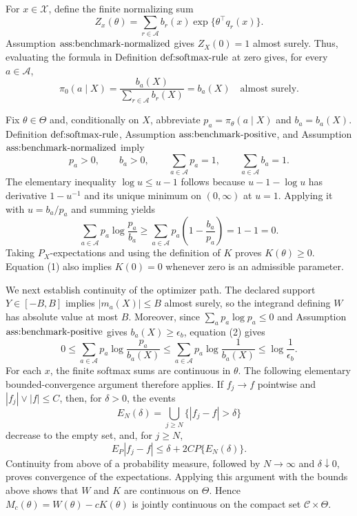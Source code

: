 For \(x\in\mathcal X\), define the finite normalizing sum
\[
 Z_x(\theta)=\sum_{r\in\mathcal A}b_r(x)
                 \exp\{\theta^\top q_r(x)\}.
\]
Assumption \(\textnormal{ass:benchmark-normalized}\) gives \(Z_X(0)=1\) almost surely.  Thus, evaluating the formula in Definition \(\textnormal{def:softmax-rule}\) at zero gives, for every \(a\in\mathcal A\),
\[
 \pi_0(a\mid X)
 =\frac{b_a(X)}{\sum_{r\in\mathcal A}b_r(X)}
 =b_a(X)
 \quad\text{almost surely}.                                      \tag{1}
\]

Fix \(\theta\in\Theta\) and, conditionally on \(X\), abbreviate \(p_a=\pi_\theta(a\mid X)\) and \(b_a=b_a(X)\).  Definition \(\textnormal{def:softmax-rule}\), Assumption \(\textnormal{ass:benchmark-positive}\), and Assumption \(\textnormal{ass:benchmark-normalized}\) imply
\[
 p_a>0,\qquad b_a>0,\qquad \sum_{a\in\mathcal A}p_a=1,
 \qquad \sum_{a\in\mathcal A}b_a=1.
\]
The elementary inequality \(\log u\leq u-1\) follows because \(u-1-\log u\) has derivative \(1-u^{-1}\) and its unique minimum on \((0,\infty)\) at \(u=1\).  Applying it with \(u=b_a/p_a\) and summing yields
\[
 \sum_{a\in\mathcal A}p_a\log\frac{p_a}{b_a}
 \geq \sum_{a\in\mathcal A}p_a\left(1-\frac{b_a}{p_a}\right)
 =1-1=0.                                                        \tag{2}
\]
Taking \(P_X\)-expectations and using the definition of \(K\) proves \(K(\theta)\geq0\).  Equation (1) also implies \(K(0)=0\) whenever zero is an admissible parameter.

We next establish continuity of the optimizer path.  The declared support \(Y\in[-B,B]\) implies \(|m_a(X)|\leq B\) almost surely, so the integrand defining \(W\) has absolute value at most \(B\).  Moreover, since \(\sum_a p_a\log p_a\leq0\) and Assumption \(\textnormal{ass:benchmark-positive}\) gives \(b_a(X)\geq\epsilon_b\), equation (2) gives
\[
 0\leq \sum_{a\in\mathcal A}p_a\log\frac{p_a}{b_a(X)}
 \leq \sum_{a\in\mathcal A}p_a\log\frac{1}{b_a(X)}
 \leq \log\frac{1}{\epsilon_b}.                              \tag{3}
\]
For each \(x\), the finite softmax sums are continuous in \(\theta\).  The following elementary bounded-convergence argument therefore applies.  If \(f_j\to f\) pointwise and \(|f_j|\vee|f|\leq C\), then, for \(\delta>0\), the events
\[
 E_N(\delta)=\bigcup_{j\geq N}\{|f_j-f|>\delta\}
\]
decrease to the empty set, and, for \(j\geq N\),
\[
 E_P|f_j-f|\leq\delta+2C P\{E_N(\delta)\}.
\]
Continuity from above of a probability measure, followed by \(N\to\infty\) and \(\delta\downarrow0\), proves convergence of the expectations.  Applying this argument with the bounds above shows that \(W\) and \(K\) are continuous on \(\Theta\).  Hence \(M_c(\theta)=W(\theta)-cK(\theta)\) is jointly continuous on the compact set \(\mathcal C\times\Theta\).

